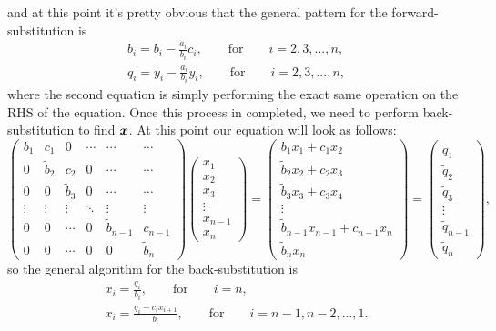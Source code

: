 \documentclass[english,notitlepage]{revtex4-1}  %
\begin{document}
and at this point it's pretty obvious that the general pattern for the forward-substitution is  
\begin{gather}
	b_i = b_i - \frac{a_i}{b_i}c_i, \qquad \text{for} \qquad i=2,3,...,n,\\
	q_i = y_i - \frac{a_i}{b_i}y_i, \qquad \text{for} \qquad i=2,3,...,n,
\end{gather}
where the second equation is simply performing the exact same operation on the RHS of the equation. Once this process in completed, we need to perform back-substitution to find $\vb*{x}$. At this point our equation will look as follows: 
\begin{equation}
		\begin{pmatrix}
	b_1 & c_1 & 0 & \cdots & \cdots & \cdots \\
	0 & \tilde{b}_2 & c_2 & 0  &\cdots & \cdots  \\ 
	0 & 0 & \tilde{b}_3 & 0 & \cdots & \cdots \\
	\vdots & \vdots & \vdots & \ddots & \vdots & \vdots \\
	0 & 0 & \cdots & 0 & \tilde{b}_{n-1} & c_{n-1} \\
	0 & 0 & \cdots  & 0 & 0 & \tilde{b}_n
	\end{pmatrix}
	\begin{pmatrix}
	x_1 \\ x_2 \\ x_3 \\ \vdots \\ x_{n-1} \\ x_n
	\end{pmatrix}
	=
	\begin{pmatrix}
	b_1x_1 + c_1x_2\\
	\tilde{b}_2x_2 + c_2x_3 \\
	\tilde{b}_3x_3 + c_3x_4 \\
	\vdots \\
	\tilde{b}_{n-1}x_{n-1} + c_{n-1}x_{n} \\
	\tilde{b}_nx_n
	\end{pmatrix}
	=
	\begin{pmatrix}
	\tilde{q}_1 \\ \tilde{q}_2 \\ \tilde{q}_3 \\ \vdots \\ \tilde{q}_{n-1} \\ \tilde{q}_n
	\end{pmatrix},
\end{equation}
so the general algorithm for the back-substitution is 
\begin{gather}
	x_i = \frac{q_i}{b_i}, \qquad \text{for} \qquad i = n,\\
	x_i = \frac{q_i - c_ix_{i+1}}{b_i},\qquad \text{for} \qquad i = n-1, n-2, ...,1.
\end{gather}
\end{document}
